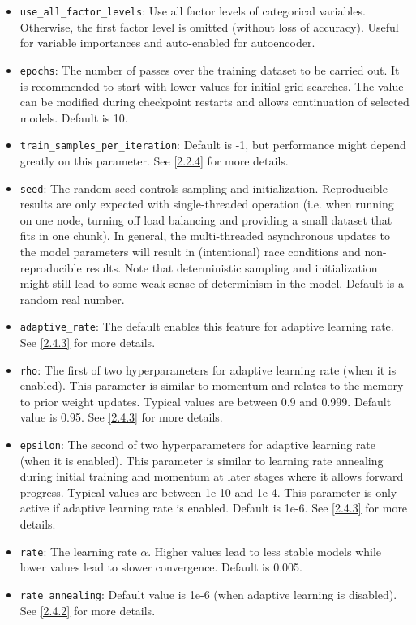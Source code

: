\documentclass[11pt]{article}
\begin{document}
\begin{itemize}
\item \texttt{use\_all\_factor\_levels}: Use all factor levels of categorical variables. Otherwise, the first factor level is omitted (without loss of accuracy). Useful for variable importances and auto-enabled for autoencoder.
\item \texttt{epochs}: The number of passes over the training dataset to be carried out. It is recommended to start with lower values for initial grid searches. The value can be modified during checkpoint restarts and allows continuation of selected models. Default is 10.
\item \texttt{train\_samples\_per\_iteration}: Default is -1, but performance might depend greatly on this parameter. See \ref{2.2.4} for more details.
\item \texttt{seed}: The random seed controls sampling and initialization. Reproducible results are only expected with single-threaded operation (i.e. when running on one node, turning off load balancing and providing a small dataset that fits in one chunk).  In general, the multi-threaded asynchronous updates to the model parameters will result in (intentional) race conditions and non-reproducible results. Note that deterministic sampling and initialization might still lead to some weak sense of determinism in the model. Default is a random real number.
\item \texttt{adaptive\_rate}: The default enables this feature for adaptive learning rate. See \ref{2.4.3}  for more details.
\item \texttt{rho}: The first of two hyperparameters for adaptive learning rate (when it is enabled). This parameter is similar to momentum and relates to the memory to prior weight updates. Typical values are between 0.9 and 0.999. Default value is 0.95. See \ref{2.4.3} for more details.
\item \texttt{epsilon}: The second of two hyperparameters for adaptive learning rate (when it is enabled). This parameter is similar to learning rate annealing during initial training and momentum at later stages where it allows forward progress. Typical values are between 1e-10 and 1e-4. This parameter is only active if adaptive learning rate is enabled. Default is 1e-6. See \ref{2.4.3} for more details.
\item \texttt{rate}: The learning rate $\alpha$. Higher values lead to less stable models  while lower values  lead to slower convergence. Default is 0.005.
\item \texttt{rate\_annealing}: Default value is 1e-6 (when adaptive learning is disabled). See \ref{2.4.2} for more details.

\end{itemize}
\end{document}
